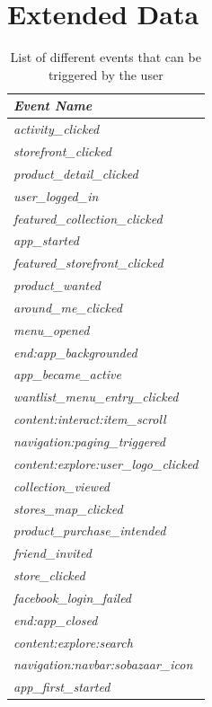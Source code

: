 \chapter{Extended Data}\label{app:req}

    \begin{table}[H]
        \centering
        \begin{tabular}{l}
            \toprule
            \emph{Event Name}   \\
            \midrule
            \emph{activity\_clicked}  \\
            \emph{storefront\_clicked}  \\
            \emph{product\_detail\_clicked}  \\
            \emph{user\_logged\_in}  \\
            \emph{featured\_collection\_clicked}  \\
            \emph{app\_started}  \\
            \emph{featured\_storefront\_clicked}  \\
            \emph{product\_wanted}  \\
            \emph{around\_me\_clicked}  \\
            \emph{menu\_opened}  \\
            \emph{end:app\_backgrounded}  \\
            \emph{app\_became\_active}  \\
            \emph{wantlist\_menu\_entry\_clicked}  \\
            \emph{content:interact:item\_scroll}  \\
            \emph{navigation:paging\_triggered}  \\
            \emph{content:explore:user\_logo\_clicked}  \\
            \emph{collection\_viewed}  \\
            \emph{stores\_map\_clicked}  \\
            \emph{product\_purchase\_intended}  \\
            \emph{friend\_invited}  \\
            \emph{store\_clicked}  \\
            \emph{facebook\_login\_failed}  \\
            \emph{end:app\_closed}  \\
            \emph{content:explore:search}  \\
            \emph{navigation:navbar:sobazaar\_icon}  \\
            \emph{app\_first\_started}  \\
            \bottomrule
        \end{tabular}
        \label{table:events}
        \caption[List of Different Events]{List of different events that can be triggered by the user}
    \end{table}

